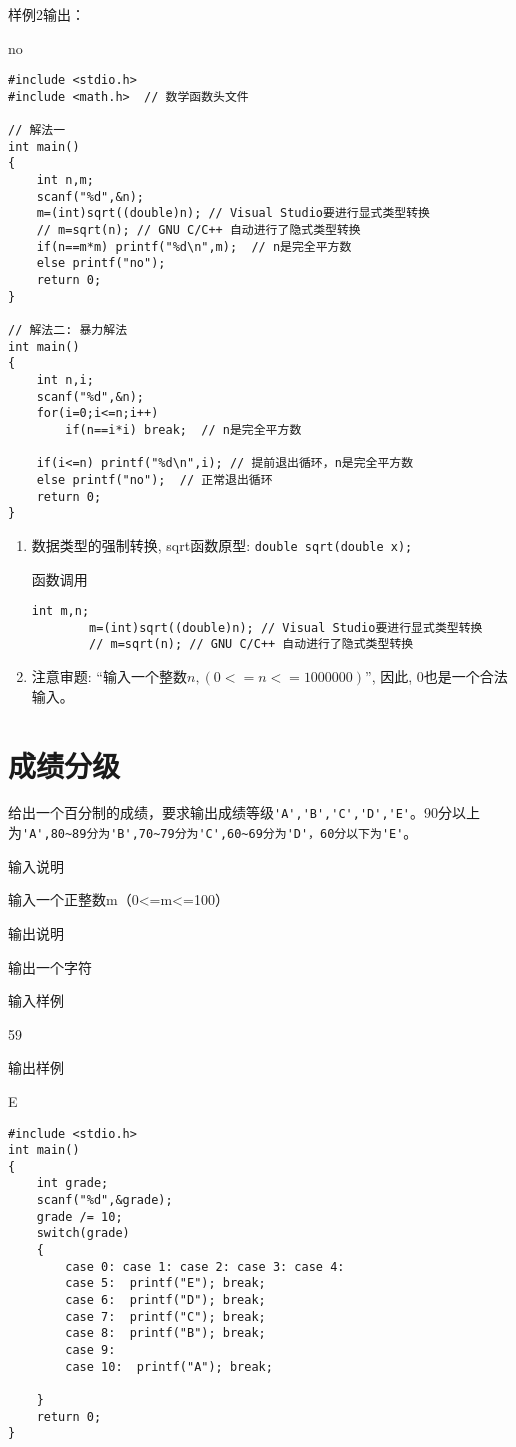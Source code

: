 样例2输出：

no

\begin{lstlisting}
#include <stdio.h>
#include <math.h>  // 数学函数头文件

// 解法一
int main()
{
	int n,m;
	scanf("%d",&n);
	m=(int)sqrt((double)n); // Visual Studio要进行显式类型转换
	// m=sqrt(n); // GNU C/C++ 自动进行了隐式类型转换
	if(n==m*m) printf("%d\n",m);  // n是完全平方数 
	else printf("no");
	return 0;
} 

// 解法二: 暴力解法 
int main()
{
	int n,i;
	scanf("%d",&n);
	for(i=0;i<=n;i++)
		if(n==i*i) break;  // n是完全平方数 
	
	if(i<=n) printf("%d\n",i); // 提前退出循环，n是完全平方数 
	else printf("no");  // 正常退出循环 
	return 0;
} 
\end{lstlisting}

\begin{note}[要点]
	\begin{enumerate}
	\item 数据类型的强制转换, sqrt函数原型: \lstinline|double sqrt(double x);|
	
	函数调用
	\begin{lstlisting}[frame=none]
		int m,n;
		m=(int)sqrt((double)n); // Visual Studio要进行显式类型转换
		// m=sqrt(n); // GNU C/C++ 自动进行了隐式类型转换
	\end{lstlisting}
	\item 注意审题: ``输入一个整数$n, (0<=n<=1000000)$'', 因此, 0也是一个合法输入。
\end{enumerate}
\end{note}

\section{成绩分级}	
给出一个百分制的成绩，要求输出成绩等级\lstinline|'A','B','C','D','E'|。90分以上为\lstinline|'A',80~89分为'B',70~79分为'C',60~69分为'D'，60分以下为'E'|。

输入说明	

输入一个正整数m（0<=m<=100）

输出说明
	
输出一个字符

输入样例
	
59

输出样例
	
E

\begin{lstlisting}
#include <stdio.h>
int main()
{
	int grade;
	scanf("%d",&grade);
	grade /= 10;
	switch(grade)
	{
		case 0: case 1: case 2: case 3: case 4: 
		case 5:  printf("E"); break;
		case 6:  printf("D"); break;
		case 7:  printf("C"); break;
		case 8:  printf("B"); break;
		case 9:
		case 10:  printf("A"); break;
		
	}
	return 0;
} 
\end{lstlisting}

